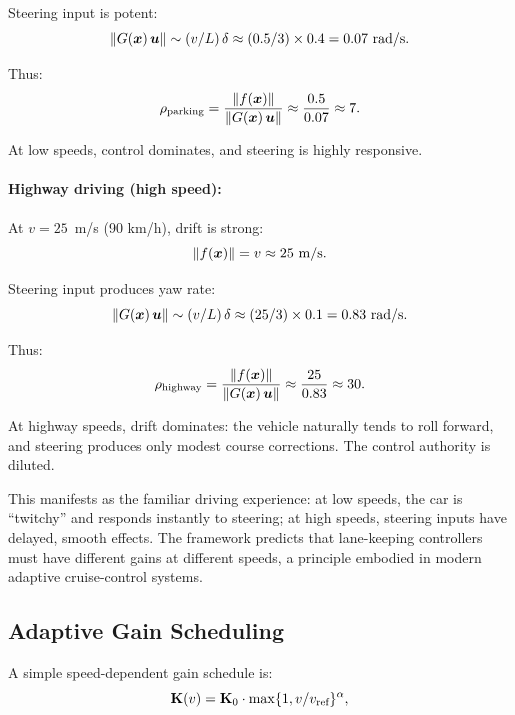 Steering input is potent:
\begin{equation}
\|G(\bm{x})\,\bm{u}\| \sim (v/L)\,\delta \approx (0.5/3) \times 0.4 = 0.07~\text{rad/s}.
\end{equation}

Thus:
\begin{equation}
\rho_{\text{parking}} = \frac{\|f(\bm{x})\|}{\|G(\bm{x})\,\bm{u}\|} \approx \frac{0.5}{0.07} \approx 7.
\end{equation}

At low speeds, control dominates, and steering is highly responsive.

\paragraph{Highway driving (high speed):}
At $v = 25$~m/s (90 km/h), drift is strong:
\begin{equation}
\|f(\bm{x})\| = v \approx 25~\text{m/s}.
\end{equation}

Steering input produces yaw rate:
\begin{equation}
\|G(\bm{x})\,\bm{u}\| \sim (v/L)\,\delta \approx (25/3) \times 0.1 = 0.83~\text{rad/s}.
\end{equation}

Thus:
\begin{equation}
\rho_{\text{highway}} = \frac{\|f(\bm{x})\|}{\|G(\bm{x})\,\bm{u}\|} \approx \frac{25}{0.83} \approx 30.
\end{equation}

At highway speeds, drift dominates: the vehicle naturally tends to roll forward, and
steering produces only modest course corrections. The control authority is diluted.

This manifests as the familiar driving experience: at low speeds, the car is ``twitchy''
and responds instantly to steering; at high speeds, steering inputs have delayed,
smooth effects. The framework predicts that lane-keeping controllers must have different
gains at different speeds, a principle embodied in modern adaptive cruise-control systems.

\subsection{Adaptive Gain Scheduling}

A simple speed-dependent gain schedule is:
\begin{equation}
\mathbf{K}(v) = \mathbf{K}_0 \cdot \max\{1, v/v_{\text{ref}}\}^{\alpha},
\label{eq:ch8:gain-schedule}
\end{equation}

